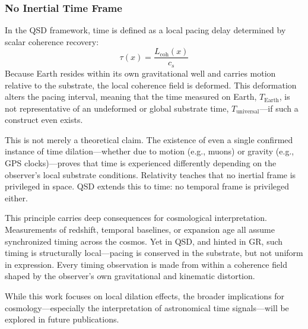 \documentclass[entropy,article,submit,pdftex,moreauthors]{Definitions/mdpi}
\begin{document}
\subsubsection{No Inertial Time Frame}

In the QSD framework, time is defined as a local pacing delay determined by scalar coherence recovery:
\[
\tau(x) = \frac{L_{\text{coh}}(x)}{c_s}
\]
Because Earth resides within its own gravitational well and carries motion relative to the substrate, the local coherence field is deformed. This deformation alters the pacing interval, meaning that the time measured on Earth, \( T_{\text{Earth}} \), is not representative of an undeformed or global substrate time, \( T_{\text{universal}} \)—if such a construct even exists.

This is not merely a theoretical claim. The existence of even a single confirmed instance of time dilation—whether due to motion (e.g., muons) or gravity (e.g., GPS clocks)—proves that time is experienced differently depending on the observer’s local substrate conditions. Relativity teaches that no inertial frame is privileged in space. QSD extends this to time: no temporal frame is privileged either.

This principle carries deep consequences for cosmological interpretation. Measurements of redshift, temporal baselines, or expansion age all assume synchronized timing across the cosmos. Yet in QSD, and hinted in GR, such timing is structurally local—pacing is conserved in the substrate, but not uniform in expression. Every timing observation is made from within a coherence field shaped by the observer’s own gravitational and kinematic distortion.

While this work focuses on local dilation effects, the broader implications for cosmology—especially the interpretation of astronomical time signals—will be explored in future publications.
\end{document}
